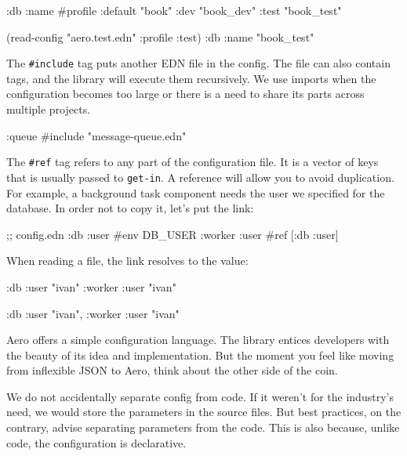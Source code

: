 \begin{clojure}
{:db {:name #profile {:default "book"
                      :dev     "book_dev"
                      :test    "book_test"}}}

(read-config "aero.test.edn" {:profile :test})
{:db {:name "book_test"}}
\end{clojure}

\fi

The \verb|#include| tag puts another EDN file in the config. The file can also contain tags, and the library will execute them recursively. We use imports when the configuration becomes too large or there is a need to share its parts across multiple projects.

\begin{clojure}
{:queue #include "message-queue.edn"}
\end{clojure}

The \verb|#ref| tag refers to any part of the configuration file. It is a vector of keys that is usually passed to \verb|get-in|. A reference will allow you to avoid duplication. For example, a background task component needs the user we specified for the database. In order not to copy it, let's put the link:

\begin{clojure}
;; config.edn
{:db {:user #env DB_USER}
 :worker {:user #ref [:db :user]}}
\end{clojure}

\noindent
When reading a file, the link resolves to the value:

\ifnarrow

\begin{clojure}
{:db {:user "ivan"}
 :worker {:user "ivan"}}
\end{clojure}

\else

\begin{clojure}
{:db {:user "ivan"}, :worker {:user "ivan"}}
\end{clojure}

\fi

Aero offers a simple configuration language. The library entices developers with the beauty of its idea and implementation. But the moment you feel like moving from inflexible JSON to Aero, think about the other side of the coin.


We do not accidentally separate config from code. If it weren't for the industry's need, we would store the parameters in the source files. But best practices, on the contrary, advise separating parameters from the code. This is also because, unlike code, the configuration is declarative.

